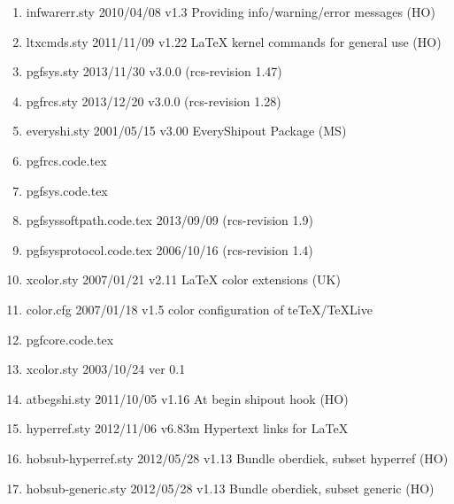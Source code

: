 \begin{enumerate}
\item infwarerr.sty 2010/04/08 v1.3 Providing info/warning/error messages (HO)
\item ltxcmds.sty 2011/11/09 v1.22 LaTeX kernel commands for general use (HO)
\item pgfsys.sty 2013/11/30 v3.0.0 (rcs-revision 1.47)
\item pgfrcs.sty 2013/12/20 v3.0.0 (rcs-revision 1.28)
\item everyshi.sty 2001/05/15 v3.00 EveryShipout Package (MS)
\item pgfrcs.code.tex
\item pgfsys.code.tex
\item pgfsyssoftpath.code.tex 2013/09/09 (rcs-revision 1.9)
\item pgfsysprotocol.code.tex 2006/10/16 (rcs-revision 1.4)
\item xcolor.sty 2007/01/21 v2.11 LaTeX color extensions (UK)
\item color.cfg 2007/01/18 v1.5 color configuration of teTeX/TeXLive
\item pgfcore.code.tex
\item 	xcolor.sty 2003/10/24 ver 0.1
\item atbegshi.sty 2011/10/05 v1.16 At begin shipout hook (HO)
\item hyperref.sty 2012/11/06 v6.83m Hypertext links for LaTeX
\item hobsub-hyperref.sty 2012/05/28 v1.13 Bundle oberdiek, subset hyperref (HO)
\item hobsub-generic.sty 2012/05/28 v1.13 Bundle oberdiek, subset generic (HO)

\end{enumerate}
